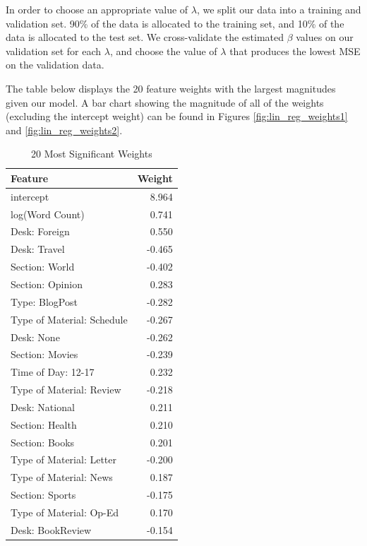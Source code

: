 \documentclass[fleqn,12pt]{SelfArx} %
\begin{document}
In order to choose an appropriate value of $\lambda$, we split our data into a training and validation set. 90\% of the data is allocated to the training set, and 10\% of the data is allocated to the test set. We cross-validate the estimated $\beta$ values on our validation set for each $\lambda$, and choose the value of $\lambda$ that produces the lowest MSE on the validation data.

The table below displays the 20 feature weights with the largest magnitudes given our model. A bar chart showing the magnitude of all of the weights (excluding the intercept weight) can be found in Figures \ref{fig:lin_reg_weights1} and \ref{fig:lin_reg_weights2}.

\begin{table}[hbt]
\caption{20 Most Significant Weights}
\centering
\begin{tabular}{lr}
\toprule
Feature  &  Weight\\
\midrule
intercept & 8.964\\
log(Word Count) & 0.741\\
Desk: Foreign & 0.550\\
Desk: Travel & -0.465\\
Section: World & -0.402\\
Section: Opinion & 0.283\\
Type: BlogPost & -0.282\\
Type of Material: Schedule & -0.267\\
Desk: None & -0.262\\
Section: Movies & -0.239\\
Time of Day: 12-17 & 0.232\\
Type of Material: Review & -0.218\\
Desk: National & 0.211\\
Section: Health & 0.210\\
Section: Books & 0.201\\
Type of Material: Letter & -0.200\\
Type of Material: News & 0.187\\
Section: Sports & -0.175\\
Type of Material: Op-Ed & 0.170\\
Desk: BookReview & -0.154\\
\bottomrule
\end{tabular}
\end{table}
\end{document}
